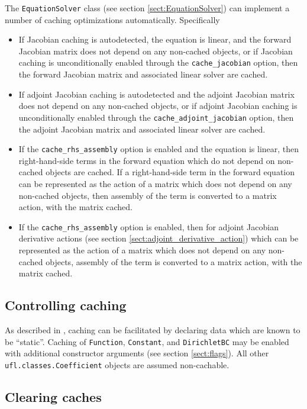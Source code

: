 \documentclass[11pt]{article}
\begin{document}
The \texttt{EquationSolver} class (see section \ref{sect:EquationSolver}) can
implement a number of caching optimizations automatically. Specifically
\begin{itemize}
  \item If Jacobian caching is autodetected, the equation is linear, and the
    forward Jacobian matrix does not depend on any non-cached objects, or if
    Jacobian caching is unconditionally enabled through the
    \texttt{cache\_jacobian} option, then the forward Jacobian matrix and
    associated linear solver are cached. 
  \item If adjoint Jacobian caching is autodetected and the adjoint Jacobian
    matrix does not depend on any non-cached objects, or if adjoint Jacobian
    caching is unconditionally enabled through the
    \texttt{cache\_adjoint\_jacobian} option, then the adjoint Jacobian matrix
    and associated linear solver are cached.
  \item If the \texttt{cache\_rhs\_assembly} option is enabled and the equation
    is linear, then right-hand-side terms in the forward equation which do not
    depend on non-cached objects are cached. If a right-hand-side term in the
    forward equation can be represented as the action of a matrix which does
    not depend on any non-cached objects, then assembly of the term is
    converted to a matrix action, with the matrix cached.
  \item If the \texttt{cache\_rhs\_assembly} option is enabled, then for
    adjoint Jacobian derivative actions (see section
    \ref{sect:adjoint_derivative_action}) which can be represented as the
    action of a matrix which does not depend on any non-cached objects,
    assembly of the term is converted to a matrix action, with the matrix
    cached.
\end{itemize}

\subsection{Controlling caching}\label{sect:static}

As described in \citet{maddison2014}, caching can be facilitated by declaring
data which are known to be ``static''. Caching of \texttt{Function},
\texttt{Constant}, and \texttt{DirichletBC} may be enabled with additional
constructor arguments (see section \ref{sect:flags}). All other
\texttt{ufl.classes.Coefficient} objects are assumed non-cachable.

\subsection{Clearing caches}\label{sect:clear_caches}
\end{document}

